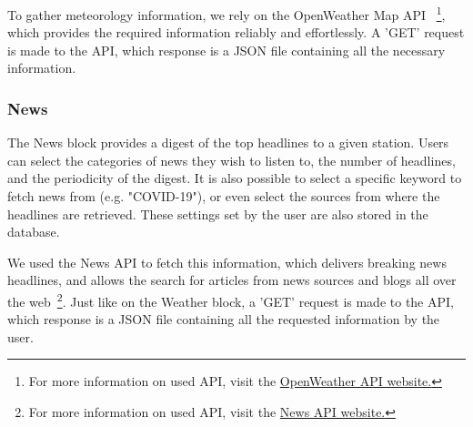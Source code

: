 To gather meteorology information, we rely on the OpenWeather Map \ac{API} ~\footnote{For more information on used API, visit the \href{https://openweathermap.org/api}{OpenWeather API website.}}, which provides the required information reliably and effortlessly. A 'GET' request is made to the \ac{API}, which response is a JSON file containing all the necessary information. 

\newpage
\subsubsection{News}

The News block provides a digest of the top headlines to a given station. Users can select the categories of news they wish to listen to, the number of headlines, and the periodicity of the digest. It is also possible to select a specific keyword to fetch news from (e.g. "COVID-19"), or even select the sources from where the headlines are retrieved. These settings set by the user are also stored in the database.

We used the News \ac{API} to fetch this information, which delivers breaking news headlines, and allows the search for articles from news sources and blogs all over the web~\footnote{For more information on used API, visit the \href{https://newsapi.org/}{News API website.}}. Just like on the Weather block, a 'GET' request is made to the \ac{API}, which response is a JSON file containing all the requested information by the user.

